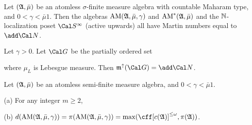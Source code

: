 Let $(\frak A,\bar\mu)$ be an atomless $\sigma$-finite measure algebra
with countable Maharam type, and $0<\gamma<\bar\mu 1$.   Then the
algebras $\mathop{\text{AM}}(\frak A,\bar\mu,\gamma)$ and $\mathop{\text{AM}}^*(\frak A,\bar\mu)$
and the $\Bbb N$-localization poset $\Cal S^{\infty}$ (active upwards)
all have Martin numbers equal to $\add\Cal N$.


 Let $\gamma>0$.   Let $\Cal G$ be the
partially ordered set


\noindent where $\mu_L$ is Lebesgue measure.   Then
$\frak m^{\uparrow}(\Cal G)=\add\Cal N$.


Let $(\frak A,\bar\mu)$ be an atomless
semi-finite measure algebra, and $0<\gamma<\bar\mu 1$.

(a) For any integer $m\ge 2$,


(b) $d(\AM(\frak A,\bar\mu,\gamma))
=\pi(\AM(\frak A,\bar\mu,\gamma))
=\max(\cff[c(\frak A)]^{\le\omega},\pi(\frak A))$.


